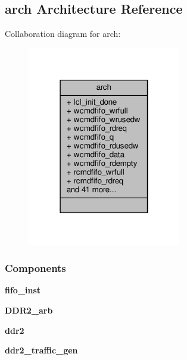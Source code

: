 \subsection{arch Architecture Reference}
\label{classDDR2__ctrl__top_1_1arch}


Collaboration diagram for arch\+:\nopagebreak
\begin{figure}[H]
\begin{center}
\leavevmode
\includegraphics[width=190pt]{df/d11/classDDR2__ctrl__top_1_1arch__coll__graph}
\end{center}
\end{figure}
\subsubsection*{Components}
 \begin{DoxyCompactItemize}
\item 
{\bf fifo\+\_\+inst}  {\bfseries }  
\item 
{\bf D\+D\+R2\+\_\+arb}  {\bfseries }  
\item 
{\bf ddr2}  {\bfseries }  
\item 
{\bf ddr2\+\_\+traffic\+\_\+gen}  {\bfseries }  
\end{DoxyCompactItemize}
